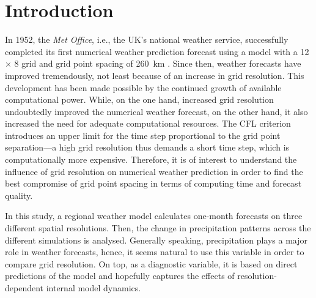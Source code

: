 \section{Introduction}

In 1952, the \textit{Met Office}, i.e., the UK's national weather service, successfully completed its first numerical weather prediction forecast using a model with a 12 \(\times\) 8 grid and grid point spacing of \SI{260}{\km} \parencite{MetOffice}. Since then, weather forecasts have improved tremendously, not least because of an increase in grid resolution. This development has been made possible by the continued growth of available computational power. While, on the one hand, increased grid resolution undoubtedly improved the numerical weather forecast, on the other hand, it also increased the need for adequate computational resources. The CFL criterion introduces an upper limit for the time step proportional to the grid point separation---a high grid resolution thus demands a short time step, which is computationally more expensive. Therefore, it is of interest to understand the influence of grid resolution on numerical weather prediction in order to find the best compromise of grid point spacing in terms of computing time and forecast quality. 


In this study, a regional weather model calculates one-month forecasts on three different spatial resolutions. Then, the change in precipitation patterns across the different simulations is analysed. Generally speaking, precipitation plays a major role in weather forecasts, hence, it seems natural to use this variable in order to compare grid resolution. On top, as a diagnostic variable, it is based on direct predictions of the model and hopefully captures the effects of resolution-dependent internal model dynamics.